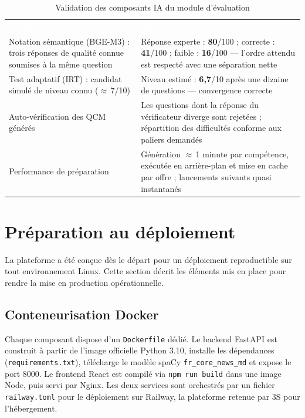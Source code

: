 \documentclass[12pt,a4paper]{report}
\begin{document}
\begin{table}[H]
\centering
\caption{Validation des composants IA du module d'évaluation}
\label{tab:metriques-s4}
\small
\begin{tabularx}{\textwidth}{X X}
\rowcolor{tabheader}
\textcolor{white}{\textbf{Composant testé}} & \textcolor{white}{\textbf{Résultat}} \\
Notation sémantique (BGE-M3) : trois réponses de qualité connue soumises à la même question & Réponse experte : \textbf{80}/100 ; correcte : \textbf{41}/100 ; faible : \textbf{16}/100 --- l'ordre attendu est respecté avec une séparation nette \\
\rowcolor{tabalt}
Test adaptatif (IRT) : candidat simulé de niveau connu ($\approx$\,7/10) & Niveau estimé : \textbf{6,7}/10 après une dizaine de questions --- convergence correcte \\
Auto-vérification des QCM générés & Les questions dont la réponse du vérificateur diverge sont rejetées ; répartition des difficultés conforme aux paliers demandés \\
\rowcolor{tabalt}
Performance de préparation & Génération $\approx$\,1 minute par compétence, exécutée en arrière-plan et mise en cache par offre ; lancements suivants quasi instantanés \\
\bottomrule
\end{tabularx}
\end{table}

\section{Préparation au déploiement}

La plateforme a été conçue dès le départ pour un déploiement reproductible sur tout environnement Linux. Cette section décrit les éléments mis en place pour rendre la mise en production opérationnelle.

\subsection{Conteneurisation Docker}

Chaque composant dispose d'un \texttt{Dockerfile} dédié. Le backend FastAPI est construit à partir de l'image officielle Python 3.10, installe les dépendances (\texttt{requirements.txt}), télécharge le modèle spaCy \texttt{fr\_core\_news\_md} et expose le port 8000. Le frontend React est compilé via \texttt{npm run build} dans une image Node, puis servi par Nginx. Les deux services sont orchestrés par un fichier \texttt{railway.toml} pour le déploiement sur Railway, la plateforme retenue par 3S pour l'hébergement.
\end{document}
